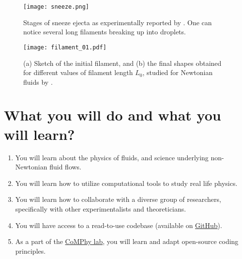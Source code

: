 \documentclass[a4paper,10pt]{article}
\begin{document}
\begin{figure}[H]
\begin{center}
 \texttt{[image: sneeze.png]}
 \caption{Stages of sneeze ejecta as experimentally reported by \citet{scharfman2016visualization}. One can notice several long filaments breaking up into droplets.}
 \label{Figure::Typical}
\end{center}
\end{figure}

\begin{figure}[H]
	\begin{center}
		\texttt{[image: filament\_01.pdf]}
		\caption{(a) Sketch of the initial filament, and (b) the final shapes obtained for different values of filament length $L_0$, studied for Newtonian fluids by \citet{anthony2019dynamics}. }
		\label{fig:filament}
	\end{center}
\end{figure}

\section*{What you will do and what you will learn?}
\begin{enumerate}
\item You will learn about the physics of fluids, and science underlying non-Newtonian fluid flows. 
\item You will learn how to utilize computational tools to study real life physics. 
\item You will learn how to collaborate with a diverse group of researchers, specifically with other experimentalists and theoreticians.
\item You will have access to a read-to-use codebase (available on \href{https://github.com/comphy-lab/multirheoflow}{GitHub}).
\item As a part of the \href{https://comphy-lab.org}{CoMPhy lab}, you will learn and adapt open-source coding principles. 

\end{enumerate}
\end{document}
